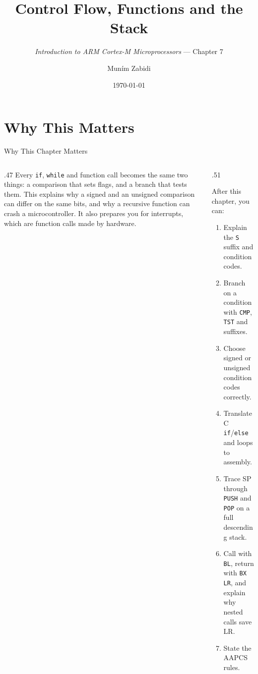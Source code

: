\documentclass[9pt,aspectratio=169,xcolor=table]{beamer}
\title{Control Flow, Functions and the Stack}
\subtitle{\emph{Introduction to ARM Cortex-M Microprocessors} --- Chapter 7}
\author{Mun\'{i}m Zabidi}
\institute{\color{primary}Faculty of Electrical Engineering, Universiti Teknologi Malaysia}
\date{\today}
\begin{document}
\titlepage

\section{Why This Matters}

\begin{frame}{Why This Chapter Matters}
    \begin{columns}[T]
    \begin{column}{.47\textwidth}
        {\normalsize Every \texttt{if}, \texttt{while} and function call becomes the same two things: a comparison that sets flags, and a branch that tests them. This explains why a signed and an unsigned comparison can differ on the same bits, and why a recursive function can crash a microcontroller. It also prepares you for interrupts, which are function calls made by hardware.}
    \end{column}
    \begin{column}{.51\textwidth}
        \begin{block}{After this chapter, you can:}
        {\small
        \begin{enumerate}\itemsep2pt
            \item Explain the \texttt{S} suffix and condition codes.
            \item Branch on a condition with \texttt{CMP}, \texttt{TST} and suffixes.
            \item Choose signed or unsigned condition codes correctly.
            \item Translate C \texttt{if}/\texttt{else} and loops to assembly.
            \item Trace SP through \texttt{PUSH} and \texttt{POP} on a full descending stack.
            \item Call with \texttt{BL}, return with \texttt{BX LR}, and explain why nested calls save LR.
            \item State the AAPCS rules.
        \end{enumerate}}
        \end{block}
    \end{column}
    \end{columns}
\end{frame}


\end{document}
